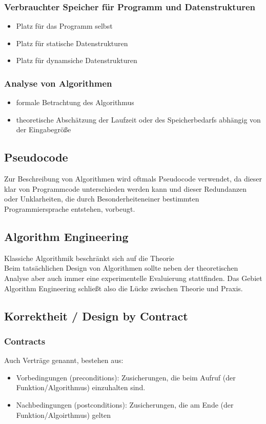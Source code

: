 \documentclass{article}
\newcommand{\important}[1]{\textcolor{importantColor}{#1}}
\newcommand{\anfuehrung}[1]{\flqq #1\frqq}
\begin{document}
\subsubsection{Verbrauchter Speicher für Programm und Datenstrukturen}
\begin{itemize}
    \item Platz für das Programm selbst
    \item Platz für statische Datenstrukturen
    \item Platz für dynamsiche Datenstrukturen
\end{itemize}

\subsubsection{Analyse von Algorithmen}
\begin{itemize}
    \item formale Betrachtung des Algorithmus
    \item theoretische Abschätzung der Laufzeit oder des Speicherbedarfs abhängig von der Eingabegröße
\end{itemize}

\subsection{Pseudocode}
Zur Beschreibung von Algorithmen wird oftmals Pseudocode verwendet, da dieser klar von Programmcode unterschieden werden kann und dieser Redundanzen oder Unklarheiten, die durch \dq Besonderheiten\dq einer bestimmten Programmiersprache entstehen, vorbeugt.

\subsection{Algorithm Engineering}
Klassiche Algorithmik beschränkt sich auf die Theorie\\
Beim tatsächlichen Design von Algorithmen sollte neben der theoretischen Analyse aber auch immer eine experimentelle Evaluierung stattfinden. Das Gebiet \anfuehrung{Algorithm Engineering} schließt also die Lücke zwischen Theorie und Praxis.

\subsection{Korrektheit / Design by Contract}
\subsubsection{Contracts}
Auch \anfuehrung{Verträge} genannt, bestehen aus:
\begin{itemize}
    \item \important{Vorbedingungen (preconditions)}: Zusicherungen, die beim Aufruf (der Funktion/Algorithmus) einzuhalten sind.
    \item \important{Nachbedingungen (postconditions)}: Zusicherungen, die am Ende (der Funktion/Algoirthmus) gelten
\end{itemize}
\end{document}
